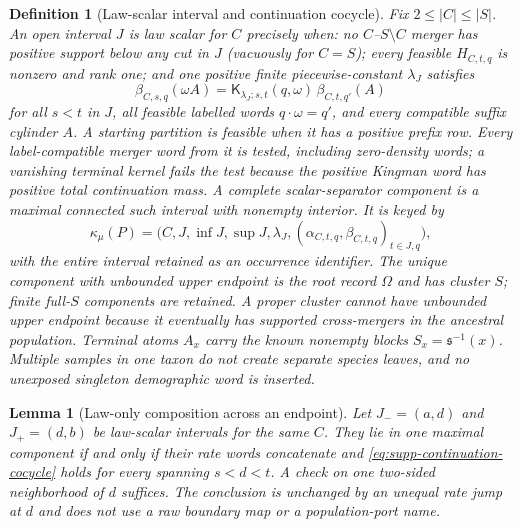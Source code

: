\documentclass[11pt]{article}
\newtheorem{lemma}[theorem]{Lemma}
\newtheorem{definition}[theorem]{Definition}
\begin{document}
\begin{definition}[Law-scalar interval and continuation cocycle]
Fix $2\le |C|\le |S|$.  An open interval $J$ is law scalar for $C$ precisely when: no $C$--$S\setminus C$ merger has positive support below any cut in $J$ (vacuously for $C=S$); every feasible $H_{C,t,q}$ is nonzero and rank one; and one positive finite piecewise-constant $\lambda_J$ satisfies
\begin{equation}
\beta_{C,s,q}(\omega A)
=\mathsf K_{\lambda_J;s,t}(q,\omega)\,
\beta_{C,t,q'}(A)
\label{eq:supp-continuation-cocycle}
\end{equation}
for all $s<t$ in $J$, all feasible labelled words $q\mathbin{\cdot}\omega=q'$, and every compatible suffix cylinder $A$.  A starting partition is feasible when it has a positive prefix row.  Every label-compatible merger word from it is tested, including zero-density words; a vanishing terminal kernel fails the test because the positive Kingman word has positive total continuation mass.  A complete scalar-separator component is a maximal connected such interval with nonempty interior.  It is keyed by
\[
\kappa_\mu(P)=
\bigl(C,J,\inf J,\sup J,\lambda_J,
(\alpha_{C,t,q},\beta_{C,t,q})_{t\in J,q}\bigr),
\]
with the entire interval retained as an occurrence identifier.  The unique component with unbounded upper endpoint is the root record $\Omega$ and has cluster $S$; finite full-$S$ components are retained.  A proper cluster cannot have unbounded upper endpoint because it eventually has supported cross-mergers in the ancestral population.  Terminal atoms $A_x$ carry the known nonempty blocks $S_x=\mathfrak s^{-1}(x)$.  Multiple samples in one taxon do not create separate species leaves, and no unexposed singleton demographic word is inserted.
\end{definition}

\begin{lemma}[Law-only composition across an endpoint]
\label{lem:supp-cocycle-composition}
Let $J_-=(a,d)$ and $J_+=(d,b)$ be law-scalar intervals for the same $C$.  They lie in one maximal component if and only if their rate words concatenate and \eqref{eq:supp-continuation-cocycle} holds for every spanning $s<d<t$.  A check on one two-sided neighborhood of $d$ suffices.  The conclusion is unchanged by an unequal rate jump at $d$ and does not use a raw boundary map or a population-port name.
\end{lemma}
\end{document}
